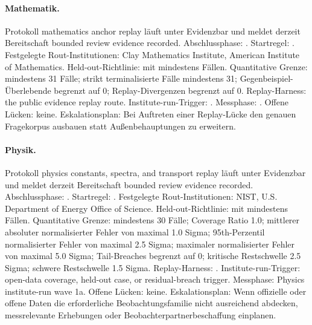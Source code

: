 \paragraph{Mathematik.}
Protokoll mathematics anchor replay läuft unter Evidenzbar  und meldet derzeit Bereitschaft bounded review evidence recorded.
Abschlussphase: . Startregel: .
Festgelegte Rout-Institutionen: Clay Mathematics Institute, \allowbreak American Institute of Mathematics.
Held-out-Richtlinie:  mit mindestens  Fällen.
Quantitative Grenze: mindestens 31 Fälle; strikt terminalisierte Fälle mindestens 31; Gegenbeispiel-Überlebende begrenzt auf 0; Replay-Divergenzen begrenzt auf 0.
Replay-Harness: the public evidence replay route.
Institute-run-Trigger: . Messphase: .
Offene Lücken: keine.
Eskalationsplan: Bei Auftreten einer Replay-Lücke den genauen Fragekorpus ausbauen statt Außenbehauptungen zu erweitern.

\paragraph{Physik.}
Protokoll physics constants, spectra, and transport replay läuft unter Evidenzbar  und meldet derzeit Bereitschaft bounded review evidence recorded.
Abschlussphase: . Startregel: .
Festgelegte Rout-Institutionen: NIST, \allowbreak U.S. Department of Energy Office of Science.
Held-out-Richtlinie:  mit mindestens  Fällen.
Quantitative Grenze: mindestens 30 Fälle; Coverage Ratio 1.0; mittlerer absoluter normalisierter Fehler von maximal 1.0 Sigma; 95th-Perzentil normalisierter Fehler von maximal 2.5 Sigma; maximaler normalisierter Fehler von maximal 5.0 Sigma; Tail-Breaches begrenzt auf 0; kritische Restschwelle 2.5 Sigma; schwere Restschwelle 1.5 Sigma.
Replay-Harness: .
Institute-run-Trigger: open-data coverage, held-out case, or residual-breach trigger. Messphase: Physics institute-run wave 1a.
Offene Lücken: keine.
Eskalationsplan: Wenn offizielle oder offene Daten die erforderliche Beobachtungsfamilie nicht ausreichend abdecken, messrelevante Erhebungen oder Beobachterpartnerbeschaffung einplanen.

